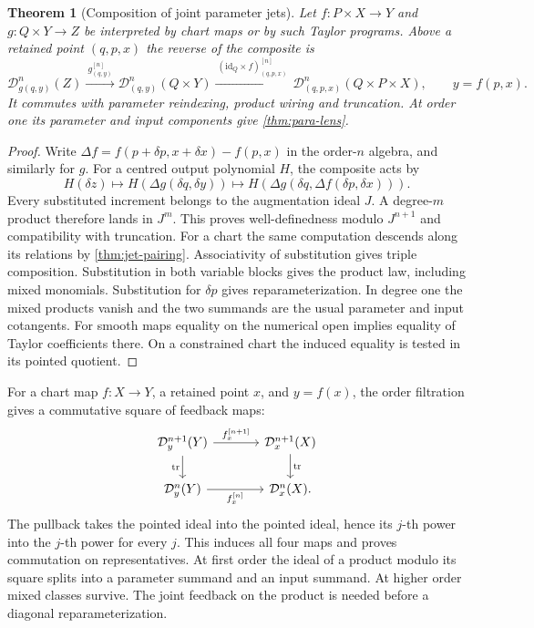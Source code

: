 \documentclass[11pt,a4paper]{article}
\newtheorem{theorem}{Theorem}[section]
\theoremstyle{definition}
\theoremstyle{remark}\newaliascnt{remark}{theorem}
\newcommand{\id}{\mathrm{id}}
\numberwithin{equation}{section}
\begin{document}
\begin{theorem}[Composition of joint parameter jets]\label{thm:joint-jet}
Let $f:P\times X\to Y$ and $g:Q\times Y\to Z$ be interpreted by chart maps or by such Taylor programs. Above a retained point $(q,p,x)$ the reverse of the composite is
\[
  \mathcal D_{g(q,y)}^n(Z)
  \xrightarrow{\ g^{[n]}_{(q,y)}\ }
  \mathcal D_{(q,y)}^n(Q\times Y)
  \xrightarrow{\ (\id_Q\times f)^{[n]}_{(q,p,x)}\ }
  \mathcal D_{(q,p,x)}^n(Q\times P\times X),\qquad y=f(p,x).
\]
It commutes with parameter reindexing, product wiring and truncation. At order one its parameter and input components give \cref{thm:para-lens}.
\end{theorem}
\begin{proof}
Write \(\Delta f=f(p+\delta p,x+\delta x)-f(p,x)\) in the order-\(n\) algebra, and similarly for \(g\). For a centred output polynomial \(H\), the composite acts by
\[
 H(\delta z)\longmapsto H(\Delta g(\delta q,\delta y))
 \longmapsto H(\Delta g(\delta q,\Delta f(\delta p,\delta x))).
\]
Every substituted increment belongs to the augmentation ideal \(J\). A degree-\(m\) product therefore lands in \(J^m\). This proves well-definedness modulo \(J^{n+1}\) and compatibility with truncation. For a chart the same computation descends along its relations by \cref{thm:jet-pairing}. Associativity of substitution gives triple composition. Substitution in both variable blocks gives the product law, including mixed monomials. Substitution for \(\delta p\) gives reparameterization. In degree one the mixed products vanish and the two summands are the usual parameter and input cotangents. For smooth maps equality on the numerical open implies equality of Taylor coefficients there. On a constrained chart the induced equality is tested in its pointed quotient.
\end{proof}
For a chart map \(f:X\to Y\), a retained point \(x\), and \(y=f(x)\), the order filtration gives a commutative square of feedback maps:
\[
\begin{tikzcd}[column sep=large]
 \mathcal D_y^{n+1}(Y)\arrow[r,"{f_x^{[n+1]}}"]\arrow[d,"\mathrm{tr}"']&
 \mathcal D_x^{n+1}(X)\arrow[d,"\mathrm{tr}"]\\
 \mathcal D_y^n(Y)\arrow[r,"{f_x^{[n]}}"']&\mathcal D_x^n(X).
\end{tikzcd}
\]
The pullback takes the pointed ideal into the pointed ideal, hence its \(j\)-th power into the \(j\)-th power for every \(j\). This induces all four maps and proves commutation on representatives. At first order the ideal of a product modulo its square splits into a parameter summand and an input summand. At higher order mixed classes survive. The joint feedback on the product is needed before a diagonal reparameterization.
\end{document}
